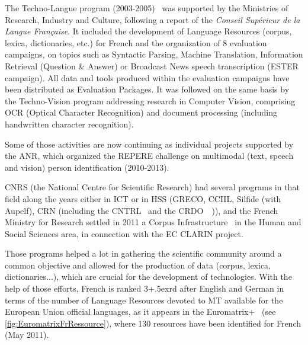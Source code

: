 \documentclass[]{../metanetpaper}
\begin{document}
\begin{multicols}{2}
The Techno-Langue program (2003-2005)~\cite{technolangue} was
supported by the Ministries of Research, Industry and Culture,
following a report of the {\em Conseil Supérieur de la Langue
  Française}. It included the development of Language Resources
(corpus, lexica, dictionaries, etc.) for French and the organization
of 8 evaluation campaigns, on topics such as Syntactic Parsing,
Machine Translation, Information Retrieval (Question \& Answer) or
Broadcast News speech transcription (ESTER campaign). All data and
tools produced within the evaluation campaigns have been distributed
as Evaluation Packages. It was followed on the same basis by the
Techno-Vision program addressing research in Computer Vision,
comprising OCR (Optical Character Recognition) and document processing
(including handwritten character recognition). 

Some of those activities are now
continuing as individual projects supported by the ANR, which
organized the REPERE challenge on multimodal (text, speech and vision)
person identification (2010-2013).

CNRS (the National Centre for Scientific Research) had several
programs in that field along the years either in ICT or in HSS (GRECO,
CCIIL, Silfide (with Aupelf), CRN (including the CNTRL~\cite{cnrtl} and the
CRDO~\cite{crdo}~\cite{crdo2})), and the French Ministry for Research settled in 2011 a
Corpus Infrastructure~\cite{infracorpus} in the Human and Social Sciences area, in
connection with the EC CLARIN project.

Those programs helped a lot in gathering the scientific community
around a common objective and allowed for the production of data
(corpus, lexica, dictionaries...), which are crucial for the development
of technologies. With the help of those efforts, French is ranked 3\raise+.5ex\hbox{rd}
after English and German in terms of the number of Language Resources
devoted to MT available for the European Union official languages, as
it appears in the Euromatrix+~\cite{euromatrixplus} (see \ref{fig:EuromatrixFrRessource}), where 130 resources have been identified for French (May 2011).


\end{multicols}
\end{document}
